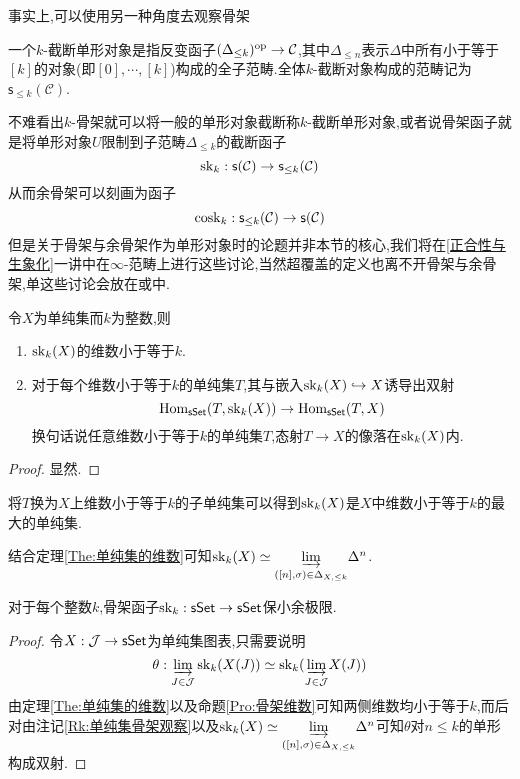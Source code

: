 事实上,可以使用另一种角度去观察骨架
\begin{definition}[$k$-截断单形对象]
    一个$k$-截断单形对象是指反变函子$(\Delta_{\leq k})^{\operatorname{op}} \to \mathcal{C}$,其中$\Delta_{\leq n}$表示$\Delta$中所有小于等于$[k]$的对象(即$[0],\cdots,[k]$)构成的全子范畴.全体$k$-截断对象构成的范畴记为$\mathsf{s}_{\leq k}(\mathcal{C})$.
\end{definition}
不难看出$k$-骨架就可以将一般的单形对象截断称$k$-截断单形对象,或者说骨架函子就是将单形对象$U$限制到子范畴$\Delta_{\leq k}$的截断函子
\[
    \operatorname{sk}_k : \mathsf{s}(\mathcal{C}) \to \mathsf{s}_{\leq k}(\mathcal{C})
\]
从而余骨架可以刻画为函子
\[
    \operatorname{cosk}_k : \mathsf{s}_{\leq k}(\mathcal{C}) \to \mathsf{s}(\mathcal{C})
\]
但是关于骨架与余骨架作为单形对象时的论题并非本节的核心,我们将在\ref{正合性与生象化}一讲中在$\infty$-范畴上进行这些讨论,当然超覆盖的定义也离不开骨架与余骨架,单这些讨论会放在\parencite[超覆盖]{代数几何笔记}或\parencite[$\S$1.2.1]{解析叠}中.

\begin{proposition}\label{Pro:骨架维数}
    令$X$为单纯集而$k$为整数,则
    \begin{enumerate}
        \item $\operatorname{sk}_k(X)$的维数小于等于$k$.
        \item 对于每个维数小于等于$k$的单纯集$T$,其与嵌入$\operatorname{sk}_k(X) \hookrightarrow X$诱导出双射
        \[
        \operatorname{Hom}_{\mathsf{sSet}}(T,\operatorname{sk}_k(X)) \to \operatorname{Hom}_{\mathsf{sSet}}(T,X)
        \]
        换句话说任意维数小于等于$k$的单纯集$T$,态射$T \to X$的像落在$\operatorname{sk}_k(X)$内.
    \end{enumerate}
\end{proposition}
\begin{proof}
    显然.
\end{proof}
\begin{corollary}
    将$T$换为$X$上维数小于等于$k$的子单纯集可以得到$\operatorname{sk}_k(X)$是$X$中维数小于等于$k$的最大的单纯集.
\end{corollary}
结合定理\ref{The:单纯集的维数}可知$\operatorname{sk}_k(X) \simeq \underset{([n],\sigma)\in\Delta_{X,\leq k}}{\underrightarrow{\lim}} \Delta^n$.
\begin{corollary}
    对于每个整数$k$,骨架函子$\operatorname{sk}_k : \mathsf{sSet} \to \mathsf{sSet}$保小余极限.
\end{corollary}
\begin{proof}
    令$X:\mathcal{J} \to \mathsf{sSet}$为单纯集图表,只需要说明
    \[
    \theta : \underset{J\in\mathcal{J}}{\underrightarrow{\lim}} \operatorname{sk}_k(X(J)) \simeq \operatorname{sk}_k(\underset{J\in\mathcal{J}}{\underrightarrow{\lim}}X(J))
    \]
    由定理\ref{The:单纯集的维数}以及命题\ref{Pro:骨架维数}可知两侧维数均小于等于$k$,而后对由注记\ref{Rk:单纯集骨架观察}以及$\operatorname{sk}_k (X)\simeq \underset{([n],\sigma)\in\Delta_{X,\leq k}}{\underrightarrow{\lim}} \Delta^n$可知$\theta$对$n \leq k$的单形构成双射.
\end{proof}
